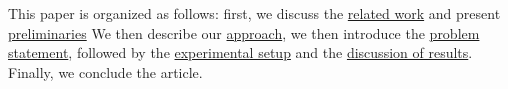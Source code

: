 This paper is organized as follows: first, we discuss the \hyperref[sec:related_work]{related work} and present \hyperref[sec:preliminaries]{preliminaries}
We then describe our \hyperref[sec:approach]{approach}, we then introduce the \hyperref[sec:problem_statement]{problem statement}, followed by the \hyperref[sec:experiment]{experimental setup} and the \hyperref[sec:result]{discussion of results}.
Finally, we conclude the article.
